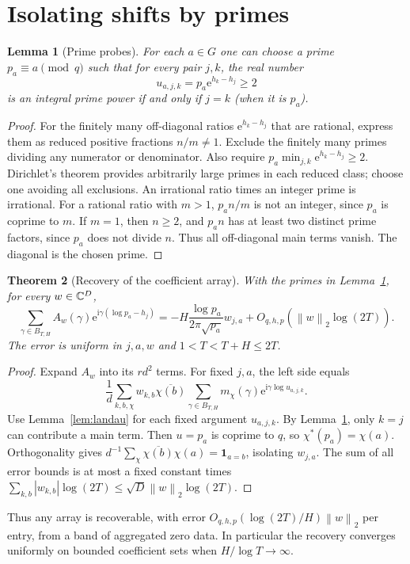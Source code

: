 \documentclass[11pt]{article}
\newtheorem{theorem}{Theorem}[section]
\newtheorem{lemma}[theorem]{Lemma}
\theoremstyle{remark}\newtheorem{remark}[theorem]{Remark}
\newcommand{\ii}{\mathrm i}\newcommand{\e}{\mathrm e}\newcommand{\ph}{\varphi}
\newcommand{\norm}[1]{\left\lVert #1\right\rVert}\newcommand{\abs}[1]{\left|#1\right|}
\begin{document}
\section{Isolating shifts by primes}
\begin{lemma}[Prime probes]\label{lem:probes}
For each $a\in G$ one can choose a prime $p_a\equiv a\pmod q$ such that for every pair $j,k$, the real number
\[
 u_{a,j,k}=p_a\e^{h_k-h_j}\ge2
\]
is an integral prime power if and only if $j=k$ (when it is $p_a$).
\end{lemma}
\begin{proof}
For the finitely many off-diagonal ratios $\e^{h_k-h_j}$ that are rational, express them as reduced positive fractions $n/m\ne1$. Exclude the finitely many primes dividing any numerator or denominator. Also require $p_a\min_{j,k}\e^{h_k-h_j}\ge2$. Dirichlet's theorem provides arbitrarily large primes in each reduced class; choose one avoiding all exclusions. An irrational ratio times an integer prime is irrational. For a rational ratio with $m>1$, $p_a n/m$ is not an integer, since $p_a$ is coprime to $m$. If $m=1$, then $n\ge2$, and $p_a n$ has at least two distinct prime factors, since $p_a$ does not divide $n$. Thus all off-diagonal main terms vanish. The diagonal is the chosen prime.
\end{proof}

\begin{theorem}[Recovery of the coefficient array]\label{thm:recovery}
With the primes in Lemma~\ref{lem:probes}, for every $w\in\mathbb C^D$,
\begin{equation}\label{eq:recovery}
 \sum_{\gamma\in B_{T,H}} A_w(\gamma)\e^{\ii\gamma(\log p_a-h_j)}
 =-H\frac{\log p_a}{2\pi\sqrt{p_a}}w_{j,a}
      +O_{q,h,p}(\norm{w}_2\log(2T)).
\end{equation}
The error is uniform in $j,a,w$ and $1<T<T+H\le2T$.
\end{theorem}
\begin{proof}
Expand $A_w$ into its $r d^2$ terms. For fixed $j,a$, the left side equals
\[
 \frac1d\sum_{k,b,\chi} w_{k,b}\overline{\chi(b)}
 \sum_{\gamma\in B_{T,H}}m_\chi(\gamma)\e^{\ii\gamma\log u_{a,j,k}}.
\]
Use Lemma~\ref{lem:landau} for each fixed argument $u_{a,j,k}$. By Lemma~\ref{lem:probes}, only $k=j$ can contribute a main term. Then $u=p_a$ is coprime to $q$, so $\chi^*(p_a)=\chi(a)$. Orthogonality gives $d^{-1}\sum_\chi \overline{\chi(b)}\chi(a)=\mathbf 1_{a=b}$, isolating $w_{j,a}$. The sum of all error bounds is at most a fixed constant times $\sum_{k,b}|w_{k,b}|\log(2T)\le\sqrt D\norm{w}_2\log(2T)$.
\end{proof}
Thus any array is recoverable, with error $O_{q,h,p}(\log(2T)/H)\norm{w}_2$ per entry, from a band of aggregated zero data. In particular the recovery converges uniformly on bounded coefficient sets when $H/\log T\to\infty$.
\end{document}

